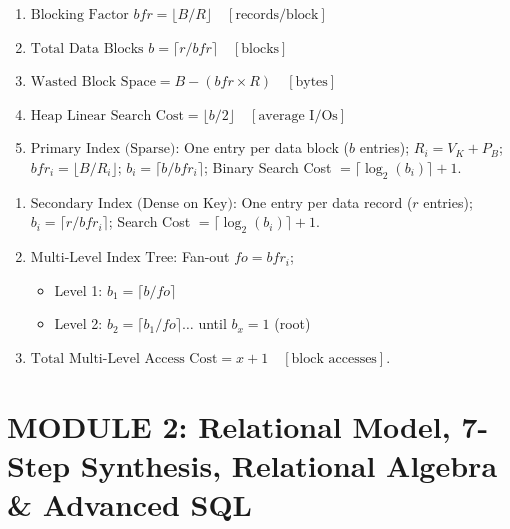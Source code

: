 \documentclass[10pt,a4paper]{article}
\begin{document}
\begin{tcolorbox}[formulabox, title=Master Formulas for File Storage \& Index Calculations]
\small
\begin{minipage}[t]{0.48\textwidth}
\begin{enumerate}
  \item $\text{Blocking Factor } bfr = \lfloor B / R \rfloor \quad [\text{records/block}]$
  \item $\text{Total Data Blocks } b = \lceil r / bfr \rceil \quad [\text{blocks}]$
  \item $\text{Wasted Block Space} = B - (bfr \times R) \quad [\text{bytes}]$
  \item $\text{Heap Linear Search Cost} = \lfloor b / 2 \rfloor \quad [\text{average I/Os}]$
  \item $\text{Primary Index (Sparse):}$ One entry per data block ($b$ entries); $R_i = V_K + P_B$; $bfr_i = \lfloor B / R_i \rfloor$; $b_i = \lceil b / bfr_i \rceil$; Binary Search Cost $= \lceil \log_2(b_i) \rceil + 1$.
\end{enumerate}
\end{minipage}\hfill
\begin{minipage}[t]{0.48\textwidth}
\begin{enumerate}[resume]
  \item $\text{Secondary Index (Dense on Key):}$ One entry per data record ($r$ entries); $b_i = \lceil r / bfr_i \rceil$; Search Cost $= \lceil \log_2(b_i) \rceil + 1$.
  \item $\text{Multi-Level Index Tree:}$ Fan-out $fo = bfr_i$;
  \begin{itemize}
    \item Level 1: $b_1 = \lceil b / fo \rceil$
    \item Level 2: $b_2 = \lceil b_1 / fo \rceil \dots$ until $b_x = 1$ (root)
  \end{itemize}
  \item $\text{Total Multi-Level Access Cost} = x + 1 \quad [\text{block accesses}]$.
\end{enumerate}
\end{minipage}
\end{tcolorbox}

\clearpage
\section{MODULE 2: Relational Model, 7-Step Synthesis, Relational Algebra \& Advanced SQL}
\end{document}
